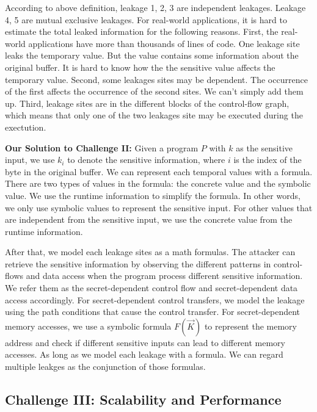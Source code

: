 According to above definition, leakage 1, 2, 3 are independent leakages. Leakage 4, 5
are mutual exclusive leakages. 
For real-world applications, it is hard to estimate the total leaked information for the following reasons.
First, the real-world applications have more than thousands of lines of code. One leakage site leaks the temporary value. 
But the value contains some information about the original buffer. It is hard to know how the 
the sensitive value affects the temporary value. Second, some leakages sites may be
dependent. The occurrence of the first affects the occurrence of the second sites. We 
can't simply add them up. Third, leakage sites are in the different blocks of the 
control-flow graph, which means that only one of the two leakages site may be executed
during the exectution.

\vspace*{6pt}
\textbf{Our Solution to Challenge II:}
Given a program $P$ with $k$ as the sensitive input, 
we use $k_i$ to denote the sensitive information, where $i$ is the index of the byte in the original buffer.  
We can represent each temporal
values with a formula. There are two types of values in the formula: the concrete value and
the symbolic value. We use the runtime information to simplify the formula. In other words,
we only use symbolic values to represent the sensitive input. For other values that are
independent from the sensitive input, we use the concrete value from the runtime information. 

After that, we model each leakage sites as a math formulas.
The attacker can retrieve the sensitive information by observing the different patterns in 
control-flows and data access when the program process different sensitive information. 
We refer them as the secret-dependent control flow and secret-dependent data access accordingly.
For secret-dependent control transfers, we model the leakage using the path conditions that cause the control
transfer. For secret-dependent memory accesses, we use a symbolic formula $F(\vec{K})$ to
represent the memory address and check if different sensitive inputs can lead to different
memory accesses. As long as we model each leakage with a formula. We can regard multiple leakges as the conjunction of
those formulas. 

\subsection{Challenge III: Scalability and Performance}

